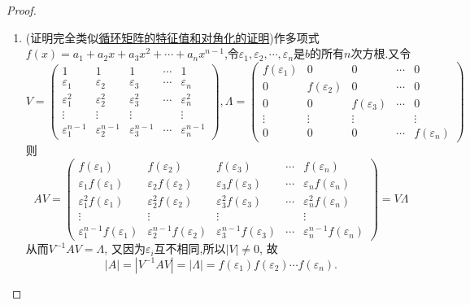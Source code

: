 \documentclass[../../main.tex]{subfiles}%
\begin{document}
\begin{proof}
\begin{enumerate}[(1)]
\item (证明完全类似\hyperref[proposition:循环矩阵的特征值和对角化]{循环矩阵的特征值和对角化的证明})作多项式\(f(x)=a_1 + a_2x + a_3x^2+\cdots + a_nx^{n - 1}\),令\(\varepsilon_1,\varepsilon_2,\cdots,\varepsilon_n\)是\(b\)的所有\(n\)次方根.又令
\[
V = 
\begin{pmatrix}
1 & 1 & 1 & \cdots & 1\\
\varepsilon_1 & \varepsilon_2 & \varepsilon_3 & \cdots & \varepsilon_n\\
\varepsilon_1^2 & \varepsilon_2^2 & \varepsilon_3^2 & \cdots & \varepsilon_n^2\\
\vdots & \vdots & \vdots & & \vdots\\
\varepsilon_1^{n - 1} & \varepsilon_2^{n - 1} & \varepsilon_3^{n - 1} & \cdots & \varepsilon_n^{n - 1}
\end{pmatrix},
\Lambda = 
\begin{pmatrix}
f(\varepsilon_1) & 0 & 0 & \cdots & 0\\
0 & f(\varepsilon_2) & 0 & \cdots & 0\\
0 & 0 & f(\varepsilon_3) & \cdots & 0\\
\vdots & \vdots & \vdots & & \vdots\\
0 & 0 & 0 & \cdots & f(\varepsilon_n)
\end{pmatrix}
\]
则
\[
AV = 
\begin{pmatrix}
f(\varepsilon_1) & f(\varepsilon_2) & f(\varepsilon_3) & \cdots & f(\varepsilon_n)\\
\varepsilon_1f(\varepsilon_1) & \varepsilon_2f(\varepsilon_2) & \varepsilon_3f(\varepsilon_3) & \cdots & \varepsilon_nf(\varepsilon_n)\\
\varepsilon_1^2f(\varepsilon_1) & \varepsilon_2^2f(\varepsilon_2) & \varepsilon_3^2f(\varepsilon_3) & \cdots & \varepsilon_n^2f(\varepsilon_n)\\
\vdots & \vdots & \vdots & & \vdots\\
\varepsilon_1^{n - 1}f(\varepsilon_1) & \varepsilon_2^{n - 1}f(\varepsilon_2) & \varepsilon_3^{n - 1}f(\varepsilon_3) & \cdots & \varepsilon_n^{n - 1}f(\varepsilon_n)
\end{pmatrix}
= V\Lambda
\]
从而$V^{-1}AV=\Lambda$,
又因为\(\varepsilon_i\)互不相同,所以\(|V|\neq0\),
故
\[
|A|=|V^{-1}AV| = |\Lambda| = f(\varepsilon_1)f(\varepsilon_2)\cdots f(\varepsilon_n).
\]
\end{enumerate}
\end{proof}
\end{document}
